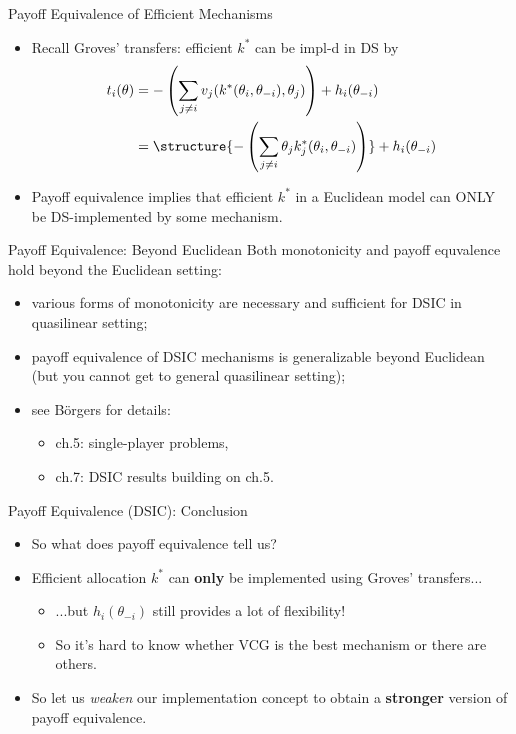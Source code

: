 \documentclass[english,10pt
,aspectratio=169
]{beamer}
\begin{document}
\begin{frame}{Payoff Equivalence of Efficient Mechanisms}
\begin{itemize}
	\item Recall Groves' transfers: efficient $k^*$ can be impl-d in DS by
	\vspace{-0.5em}\begin{align*}
		t_{i}(\theta) &= -\left(\sum_{j\neq i} v_{j}(k^*(\theta_i, \theta_{-i}), \theta_{j}) \right) + h_{i}(\theta_{-i})
		\\ &= \structure{-\left(\sum_{j\neq i} \theta_j k_j^*(\theta_i, \theta_{-i}) \right)} + h_{i}(\theta_{-i})
	\end{align*}
	
	\pause
	\item Payoff equivalence implies that \alert{efficient} $k^*$ in a \alert{Euclidean} model can \alert{ONLY} be DS-implemented by some  mechanism.
\end{itemize}
\end{frame}


\begin{frame}{Payoff Equivalence: Beyond Euclidean}
	Both monotonicity and payoff equvalence hold beyond the Euclidean setting:
	\begin{itemize}
		\item various forms of \alert{monotonicity} are necessary and sufficient for DSIC in quasilinear setting;
		\item \alert{payoff equivalence} of DSIC mechanisms is generalizable beyond Euclidean (but you cannot get to general quasilinear setting);
		\item see B{\"o}rgers for details:
		\begin{itemize}
			\item ch.5: single-player problems,
			\item ch.7: DSIC results building on ch.5.
		\end{itemize}
	\end{itemize}
\end{frame}


\begin{frame}{Payoff Equivalence (DSIC): Conclusion}
	\begin{itemize}
		\item So what does payoff equivalence tell us?
		\item Efficient allocation $k^*$ can \textbf{only} be implemented using Groves' transfers...
		\begin{itemize}
			\item ...but $h_i(\theta_{-i})$ still provides a lot of flexibility!
			\item So it's hard to know whether VCG is the best mechanism or there are others.
		\end{itemize}
		\item So let us \emph{weaken} our implementation concept to obtain a \textbf{stronger} version of payoff equivalence.
	\end{itemize}
\end{frame}
\end{document}
